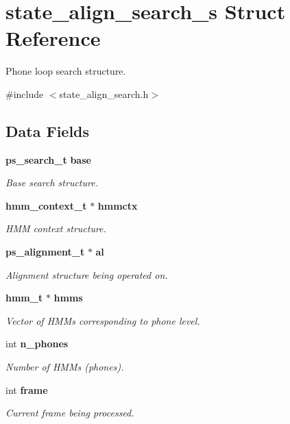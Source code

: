 \section{state\+\_\+align\+\_\+search\+\_\+s Struct Reference}
\label{structstate__align__search__s}


Phone loop search structure.  




{\ttfamily \#include $<$state\+\_\+align\+\_\+search.\+h$>$}

\subsection*{Data Fields}
\begin{DoxyCompactItemize}
\item 
\textbf{ ps\+\_\+search\+\_\+t} \textbf{ base}
\begin{DoxyCompactList}\small\item\em Base search structure. \end{DoxyCompactList}\item 
\textbf{ hmm\+\_\+context\+\_\+t} $\ast$ \textbf{ hmmctx}
\begin{DoxyCompactList}\small\item\em H\+MM context structure. \end{DoxyCompactList}\item 
\textbf{ ps\+\_\+alignment\+\_\+t} $\ast$ \textbf{ al}
\begin{DoxyCompactList}\small\item\em Alignment structure being operated on. \end{DoxyCompactList}\item 
\textbf{ hmm\+\_\+t} $\ast$ \textbf{ hmms}
\begin{DoxyCompactList}\small\item\em Vector of H\+M\+Ms corresponding to phone level. \end{DoxyCompactList}\item 
int \textbf{ n\+\_\+phones}
\begin{DoxyCompactList}\small\item\em Number of H\+M\+Ms (phones). \end{DoxyCompactList}\item 
int \textbf{ frame}
\begin{DoxyCompactList}\small\item\em Current frame being processed. \end{DoxyCompactList}\item 

\end{DoxyCompactItemize}
